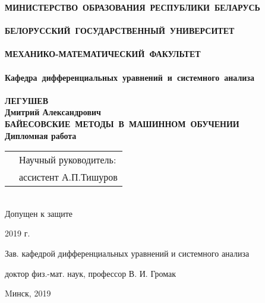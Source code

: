 
\setcounter{page}{1}
\thispagestyle{empty}
\begin{center}
\bf
\vspace{4cm}
{
\mbox{МИНИСТЕРСТВО~ОБРАЗОВАНИЯ~РЕСПУБЛИКИ~БЕЛАРУСЬ} \\~\\
\mbox{БЕЛОРУССКИЙ~ГОСУДАРСТВЕННЫЙ~УНИВЕРСИТЕТ} \\~\\
\mbox{МЕХАНИКО-МАТЕМАТИЧЕСКИЙ~ФАКУЛЬТЕТ} \\~\\
\mbox{Кафедра~дифференциальных~уравнений~и~системного~анализа} \\~\\
}
\vspace{3.5cm}
\rm ЛЕГУШЕВ\\
\vspace{0.2cm}
Дмитрий Александрович\\
\vspace{1.5cm}
\small
\bf
\mbox{БАЙЕСОВСКИЕ МЕТОДЫ В МАШИННОМ ОБУЧЕНИИ}\\
\vspace{1.5cm} \rm Дипломная работа 
\vspace{2cm}
\end{center}
\begin{tabular}{ll}
\hspace{12.5cm}
&Научный руководитель:\\
&ассистент А.П.Тишуров\\
\end{tabular}\\
\setlength{\parindent}{30mm}
\indent Допущен к защите\par
\textquote{\underline{\hspace{5mm}}} \underline{\hspace{3cm}} 2019 г.\par
Зав. кафедрой дифференциальных уравнений и системного анализа\par
доктор физ.-мат. наук, профессор В. И. Громак\par
\vspace{2.5cm}
\setlength{\parindent}{10mm}
\begin{center}
    Mинск, 2019
\end{center}
\clearpage
\restoregeometry

